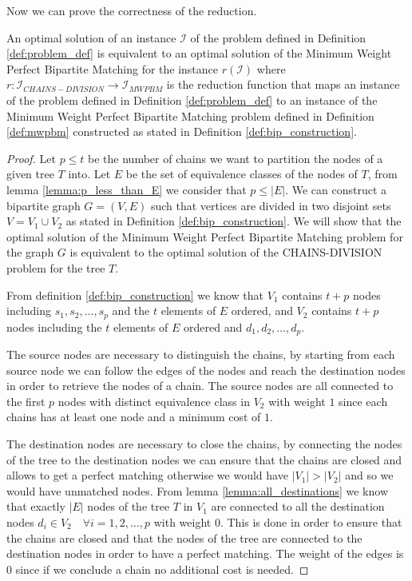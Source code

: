 Now we can prove the correctness of the reduction.

\begin{theorem}
    An optimal solution of an instance $\mathcal I$ of the problem defined in Definition \ref{def:problem_def} is equivalent to an optimal solution of the Minimum Weight Perfect Bipartite Matching for the instance $r(\mathcal I)$ where $r: \mathcal{I}_{CHAINS-DIVISION} \rightarrow \mathcal{I}_{MWPBM}$ is the reduction function that maps an instance of the problem defined in Definition \ref{def:problem_def} to an instance of the Minimum Weight Perfect Bipartite Matching problem defined in Definition \ref{def:mwpbm} constructed as stated in Definition \ref{def:bip_construction}.
\end{theorem}

\begin{proof}
    Let $p \leq t$ be the number of chains we want to partition the nodes of a given tree $T$ into. Let $E$ be the set of equivalence classes of the nodes of $T$, from lemma \ref{lemma:p_less_than_E} we consider that $p \leq |E|$. We can construct a bipartite graph $G = (V, E)$ such that vertices are divided in two disjoint sets $V = V_1 \cup V_2$ as stated in Definition \ref{def:bip_construction}. We will show that the optimal solution of the Minimum Weight Perfect Bipartite Matching problem for the graph $G$ is equivalent to the optimal solution of the \textsc{CHAINS-DIVISION} problem for the tree $T$.

    From definition \ref{def:bip_construction} we know that $V_1$ contains $t + p$ nodes including $s_1, s_2, \dots, s_p$ and the $t$ elements of $E$ ordered, and $V_2$ contains $t + p$ nodes including the $t$ elements of $E$ ordered and $d_1, d_2, \dots, d_p$. 

    The source nodes are necessary to distinguish the chains, by starting from each source node we can follow the edges of the nodes and reach the destination nodes in order to retrieve the nodes of a chain. The source nodes are all connected to the first $p$ nodes with distinct equivalence class in $V_2$ with weight $1$ since each chains has at least one node and a minimum cost of $1$.
    
    The destination nodes are necessary to close the chains, by connecting the nodes of the tree to the destination nodes we can ensure that the chains are closed and allows to get a perfect matching otherwise we would have $|V_1| > |V_2|$ and so we would have unmatched nodes. From lemma \ref{lemma:all_destinations} we know that exactly $|E|$ nodes of the tree $T$ in $V_1$ are connected to all the destination nodes $d_i \in V_2 \quad \forall i = 1, 2, \dots, p$ with weight $0$. This is done in order to ensure that the chains are closed and that the nodes of the tree are connected to the destination nodes in order to have a perfect matching. The weight of the edges is $0$ since if we conclude a chain no additional cost is needed.


\end{proof}
